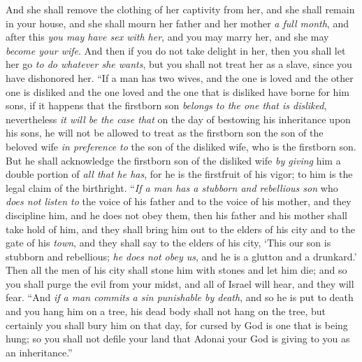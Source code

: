 \begin{biblechapter}
\verse And she shall remove the clothing of her captivity from her, and she shall remain in your house, and she shall mourn her father and her mother \textit{a full month}, and after this \textit{you may have sex with her}, and you may marry her, and she may \textit{become your wife}.
\verse And then if you do not take delight in her, then you shall let her go \textit{to do whatever she wants}, but you shall not treat her as a slave, since you have dishonored her.
\verse “If a man has two wives, and the one is loved and the other one is disliked and the one loved and the one that is disliked have borne for him sons, if it happens that the firstborn son \textit{belongs to the one that is disliked},
\verse nevertheless \textit{it will be the case that} on the day of bestowing his inheritance upon his sons, he will not be allowed to treat as the firstborn son the son of the beloved wife \textit{in preference to} the son of the disliked wife, who is the firstborn son.
\verse But he shall acknowledge the firstborn son of the disliked wife \textit{by giving} him a double portion of \textit{all that he has}, for he is the firstfruit of his vigor; to him is the legal claim of the birthright.
\verse “\textit{If a man has a stubborn and rebellious son} who \textit{does not listen to} the voice of his father and to the voice of his mother, and they discipline him, and he does not obey them,
\verse then his father and his mother shall take hold of him, and they shall bring him out to the elders of his city and to the gate of his \textit{town},
\verse and they shall say to the elders of his city, ‘This our son is stubborn and rebellious; \textit{he does not obey us}, and he is a glutton and a drunkard.’
\verse Then all the men of his city shall stone him with stones and let him die; and so you shall purge the evil from your midst, and all of Israel will hear, and they will fear.
\verse “And \textit{if a man commits a sin punishable by death}, and so he is put to death and you hang him on a tree,
\verse his dead body shall not hang on the tree, but certainly you shall bury him on that day, for cursed by God is one that is being hung; so you shall not defile your land that Adonai your God is giving to you as an inheritance.”
\end{biblechapter}

